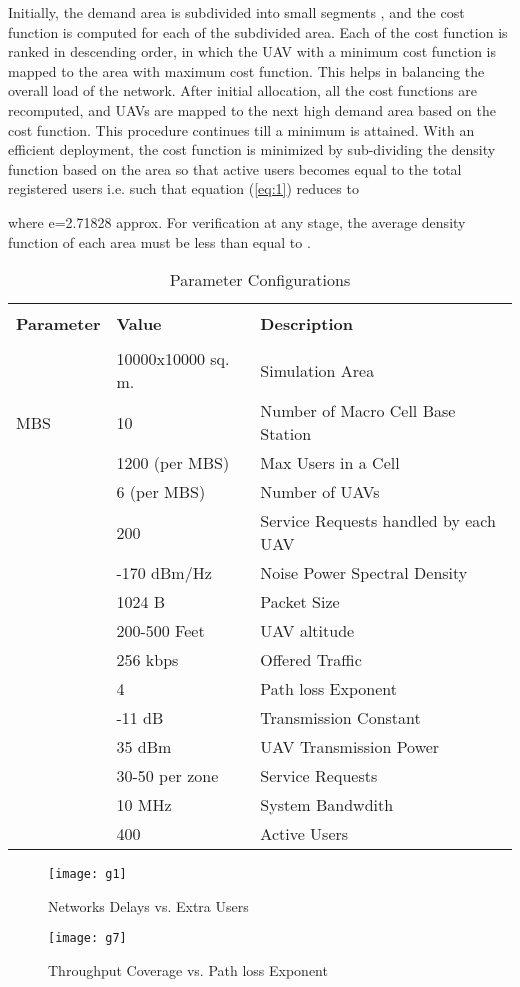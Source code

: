 \documentclass[journal]{IEEEtran}
\begin{document}
Initially, the demand area  is subdivided into small segments , and the cost function is computed for each of the subdivided area. Each of the cost function is ranked in descending order, in which the UAV with a minimum cost function is mapped to the area with maximum cost function. This helps in balancing the overall load of the network. After initial allocation, all the cost functions are recomputed, and UAVs are mapped to the next high demand area based on the cost function. This procedure continues till a minimum is attained. With an efficient deployment, the cost function is minimized by sub-dividing the density function based on the area so that active users becomes equal to the total registered users i.e.  such that equation (\ref{eq:1}) reduces to

where e=2.71828 approx. For verification at any stage, the average density function of each area must be less than equal to .
\begin{table}[!ht]
\fontsize{7}{9}\selectfont
\centering
\caption{Parameter Configurations}\label{self_conf}\begin{tabular}{l l l}
\hline\\
\textbf{Parameter} & \textbf{Value} & \textbf{Description}\\
\hline
\hline\\
 & 10000x10000 sq. m. & Simulation Area\\
MBS & 10& Number of Macro Cell Base Station\\
 & 1200 (per MBS) & Max Users in a Cell\\
& 6 (per MBS)& Number of UAVs\\
 & 200 & Service Requests handled by each UAV\\
 & -170 dBm/Hz & Noise Power Spectral Density\\
 & 1024 B&Packet Size \\
 &200-500 Feet& UAV altitude\\
 & 256 kbps& Offered Traffic\\
& 4&Path loss Exponent\\
 & -11 dB & Transmission Constant\\
 & 35 dBm & UAV Transmission Power \\
& 30-50 per zone& Service Requests\\
 & 10 MHz& System Bandwdith\\
 & 400 & Active Users\\
\hline
\end{tabular}
\end{table}\begin{figure}[!ht]
\begin{minipage}[t]{0.20\textwidth}
\centering
\texttt{[image: g1]}
\caption{\fontsize{6}{6}\selectfont Networks Delays vs. Extra Users }
\label{g1}
\end{minipage}
\hspace{\fill}
\begin{minipage}[t]{0.26\textwidth}
\centering
\texttt{[image: g7]}
\caption{\fontsize{6}{6}\selectfont Throughput Coverage vs. Path loss Exponent}
\label{g3}
\end{minipage}
\end{figure}
\end{document}
